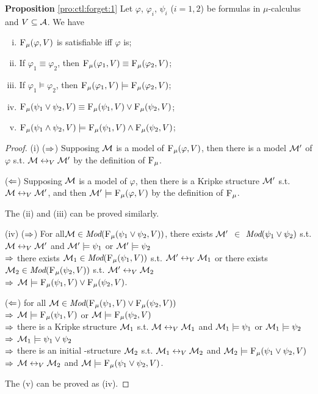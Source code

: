 \documentclass[runningheads]{llncs}
\begin{document}
\noindent\textbf{Proposition}
\ref{pro:ctl:forget:1}
 Let $\varphi$, $\varphi_i$, $\psi_i$ ($i=1,2$) be formulas in $\mu$-calculus and $V\subseteq {\cal A}$. We have
 \begin{enumerate}[(i)]
   \item ${\textsc{F}_{\textsc{$\mu$}}}(\varphi, V)$ is satisfiable iff $\varphi$ is;
   \item If $\varphi_1 \equiv \varphi_2$, then ${\textsc{F}_{\textsc{$\mu$}}}(\varphi_1, V) \equiv {\textsc{F}_{\textsc{$\mu$}}}(\varphi_2, V)$;
   \item If $\varphi_1 \models \varphi_2$, then ${\textsc{F}_{\textsc{$\mu$}}}(\varphi_1, V) \models {\textsc{F}_{\textsc{$\mu$}}}(\varphi_2, V)$;
   \item ${\textsc{F}_{\textsc{$\mu$}}}(\psi_1 \vee \psi_2, V) \equiv {\textsc{F}_{\textsc{$\mu$}}}(\psi_1, V) \vee {\textsc{F}_{\textsc{$\mu$}}}(\psi_2, V)$;
   \item ${\textsc{F}_{\textsc{$\mu$}}}(\psi_1 \wedge \psi_2, V) \models {\textsc{F}_{\textsc{$\mu$}}}(\psi_1, V) \wedge {\textsc{F}_{\textsc{$\mu$}}}(\psi_2, V)$;
 \end{enumerate}
\begin{proof}
 (i) ($\Rightarrow$) Supposing ${\cal M}$ is a model of ${\textsc{F}_{\textsc{$\mu$}}}(\varphi, V)$, then there is a model ${\cal M}'$ of $\varphi$ s.t. ${\cal M} \leftrightarrow_V {\cal M}'$ by the definition of ${\textsc{F}_{\textsc{$\mu$}}}$.

 ($\Leftarrow$) Supposing ${\cal M}$ is a model of $\varphi$, then there is a Kripke structure ${\cal M}'$ s.t. ${\cal M} \leftrightarrow_V {\cal M}'$, and then ${\cal M}' \models {\textsc{F}_{\textsc{$\mu$}}}(\varphi, V)$ by the definition of ${\textsc{F}_{\textsc{$\mu$}}}$.

 The (ii) and (iii) can be proved similarly.

 (iv) ($\Rightarrow$) For all${\cal M}\in \textit{Mod}({\textsc{F}_{\textsc{$\mu$}}}(\psi_1 \vee \psi_2, V))$, there exists ${\cal M}'$ $\in$  $\textit{Mod}(\psi_1\vee \psi_2)$ s.t. ${\cal M} \leftrightarrow_V {\cal M}'$ and ${\cal M}' \models \psi_1$ or ${\cal M}' \models \psi_2$ \\
 $\Rightarrow$ there exists ${\cal M}_1 \in \textit{Mod}({\textsc{F}_{\textsc{$\mu$}}}(\psi_1, V))$ s.t. ${\cal M}' \leftrightarrow_V {\cal M}_1$ or there exists ${\cal M}_2 \in \textit{Mod}({\textsc{F}_{\textsc{$\mu$}}}(\psi_2, V))$ s.t. ${\cal M}' \leftrightarrow_V {\cal M}_2$ \\
 $\Rightarrow$ ${\cal M} \models {\textsc{F}_{\textsc{$\mu$}}}(\psi_1, V) \vee {\textsc{F}_{\textsc{$\mu$}}}(\psi_2, V)$.

 ($\Leftarrow$) for all ${\cal M} \in \textit{Mod}({\textsc{F}_{\textsc{$\mu$}}}(\psi_1, V) \vee {\textsc{F}_{\textsc{$\mu$}}}(\psi_2, V))$\\
 $\Rightarrow$ ${\cal M} \models {\textsc{F}_{\textsc{$\mu$}}}(\psi_1,V)$ or ${\cal M} \models {\textsc{F}_{\textsc{$\mu$}}}(\psi_2,V)$\\
 $\Rightarrow$ there is a Kripke structure ${\cal M}_1$ s.t. ${\cal M} \leftrightarrow_V {\cal M}_1$ and ${\cal M}_1 \models \psi_1$ or  ${\cal M}_1 \models \psi_2$\\
 $\Rightarrow$ ${\cal M}_1 \models \psi_1 \vee \psi_2$\\
 $\Rightarrow$ there is an initial \MPK-structure ${\cal M}_2$ s.t. ${\cal M}_1 \leftrightarrow_V {\cal M}_2$ and ${\cal M}_2 \models {\textsc{F}_{\textsc{$\mu$}}}(\psi_1 \vee \psi_2, V)$\\
 $\Rightarrow$ ${\cal M} \leftrightarrow_V {\cal M}_2$ and ${\cal M} \models {\textsc{F}_{\textsc{$\mu$}}}(\psi_1 \vee \psi_2, V)$.

 The (v) can be proved as (iv).
 \end{proof}
\end{document}
